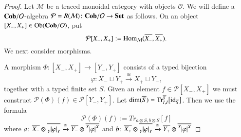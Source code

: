 \documentclass{amsart}
\def\tn{\textnormal}
\def\mc{\mathcal}
\def\Hom{\tn{Hom}}
\def\Ob{\tn{Ob}}
\def\dim{\tn{dim}}
\def\Trace{\tn{Tr}}
\def\hsp{\hspace{.3in}}
\def\to{\rightarrow}
\def\taking{\colon}
\def\too{\longrightarrow}
\def\iso{\cong}
\def\ol{\overline}
\newcommand{\To}[1]{\xrightarrow{#1}}
\def\id{\tn{id}}
\def\Cob{{\bf Cob}}
\def\Set{{\bf Set}}
\def\mcM{\mc{M}}
\def\mcO{\mc{O}}
\def\mcP{\mc{P}}
\newcommand{\inp}[1]{{#1_-}}
\newcommand{\outp}[1]{{#1_+}}
\newcommand{\feeddd}[3]{{\tensor*[^{#2}_{\color{white}{!}}]{{|#1|}}{^{#3}}}}%
\newcommand{\feeddc}[3]{{\tensor*[^{#2}]{{|#1|}}{_{#3}}}}
\newcommand{\feedcd}[3]{{\tensor*[_{#2}]{{|#1|}}{^{#3}}}}
\newcommand{\feedcc}[3]{{\tensor*[^{\color{white}{!}}_{#2}]{{|#1|}}{_{#3}}}}
\newcommand{\vfeeddd}[3]{\ol{{\tensor*[^{#2}_{\color{white}{!}}]{{|#1|}}{^{#3}}}}}%
\newcommand{\vfeedcc}[3]{\ol{{\tensor*[^{\color{white}{!}}_{#2}]{{|#1|}}{_{#3}}}}}
\newcommand{\feedda}[3]{{\tensor*[^{#2}_{\color{white}{!}}]{{#1}}{^{#2}_{#3}}}}
\newcommand{\feedca}[3]{{\tensor*[_{#2}]{{#1}}{_{#2}^{#3}}}}
\newcommand{\feedad}[3]{{\tensor*[^{#2}_{#3}]{{#1}}{^{#2}}}}
\newcommand{\feedac}[3]{{\tensor*[_{#2}^{#3}]{{#1}}{_{#2}}}}
\newcommand{\vLst}[1]{\ol{#1}}
\newcommand{\vinp}[1]{\vLst{\inp{#1}}}
\newcommand{\voutp}[1]{\vLst{\outp{#1}}}
\theoremstyle{remark}
\theoremstyle{definition}
\begin{document}
\begin{proof}

Let $\mcM$ be a traced monoidal category with objects $\mcO$. We will define a $\Cob/\mcO$-algebra $\mcP=R(\mcM)\taking\Cob/\mcO\to\Set$ as follows. On an object $[\inp{X},\outp{X}]\in\Ob(\Cob/\mcO)$, put 
$$\mcP[\inp{X},\outp{X}]:=\Hom_{\mcM}(\vinp{X},\voutp{X}).$$
We next consider morphisms.


A morphism $\Phi\taking[\inp{X},\outp{X}]\too[\inp{Y},\outp{Y}]$ consists of a typed bijection 
$$\varphi\taking\inp{X}\sqcup \outp{Y}\To{\iso}\outp{X}\sqcup \inp{Y},$$ 
together with a typed finite set $S$. Given an element $f\in\mcP[\inp{X},\outp{X}]$ we must construct $\mcP(\Phi)(f)\in\mcP[\inp{Y},\outp{Y}]$. Let $\dim(\ol{S})=\Trace^{\ol{S}}_{I,I}\big[\id_{\ol{S}}\big]$. Then we use the formula
$$\mcP(\Phi)(f):=Tr_{a\otimes S,b\otimes S}[f]
$$
where $a\taking\vinp{X}\otimes\vfeedcc{\varphi}{Y}{Y}\To{\iso}\vinp{Y}\otimes\vfeeddd{\varphi}{X}{X}$ and $b\taking\voutp{X}\otimes\vfeedcc{\varphi}{Y}{Y}\To{\iso}\voutp{Y}\otimes\vfeeddd{\varphi}{X}{X}$


\end{proof}
\end{document}
